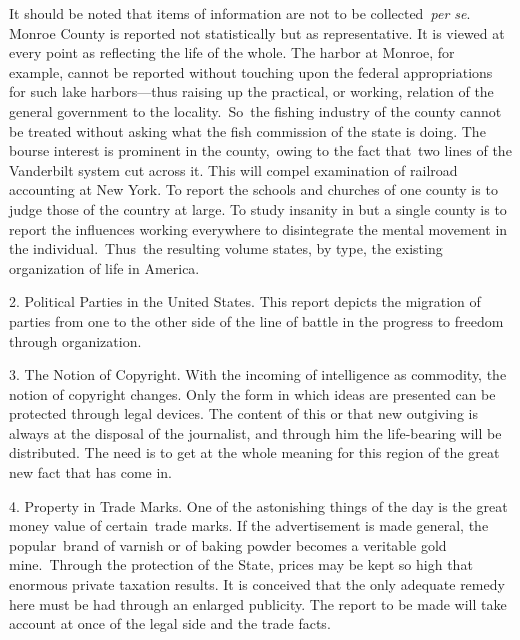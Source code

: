 \documentclass[twoside,symmetric,nobib,justified]{tufte-book}
\begin{document}
It should be noted that items of information are not to be
collected\emph{~per se}. Monroe County is reported not statistically but
as representative. It is viewed at every point as reflecting the life of
the whole. The harbor at Monroe, for example, cannot be reported without
touching upon the federal appropriations for such lake harbors---thus
raising up the practical, or working, relation of the general government
to the locality.~So~the fishing industry of the county cannot be treated
without asking what the fish commission of the state is doing. The
bourse interest is prominent in the county,~owing to the fact that~two
lines of the Vanderbilt system cut across it. This will compel
examination of railroad accounting at New York. To report the schools
and churches of one county is to judge those of the country at large. To
study insanity in but a single county is to report the influences
working everywhere to disintegrate the mental movement in the
individual.~Thus~the resulting volume states, by type, the existing
organization of life in America.~

\vspace{.05in}

2. Political Parties in the United States. This report depicts the
migration of parties from one to the other side of the line of battle in
the progress to freedom through organization.~

\vspace{.05in}

3. The Notion of Copyright. With the incoming of intelligence as
commodity, the notion of copyright changes. Only the form in which ideas
are presented can be protected through legal devices. The content of
this or that new outgiving is always at the disposal of the journalist,
and through him the life-bearing will be distributed. The need is to get
at the whole meaning for this region of the great new fact that has come
in.~

\vspace{.05in}

4. Property in Trade Marks. One of the astonishing things of the day is
the great money value of certain~trade marks. If the advertisement is
made general, the popular~brand of varnish or of baking powder becomes a
veritable gold mine.~Through the protection of the State, prices may be
kept so high that enormous private taxation results. It is conceived
that the only adequate remedy here must be had through an enlarged
publicity. The report to be made will take account at once of the legal
side and the trade facts.~
\end{document}
